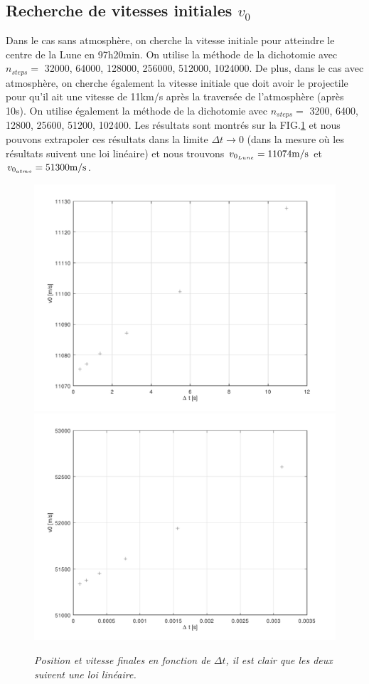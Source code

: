 \documentclass[a4paper,12pt,twoside]{article}
\begin{document}
\subsection{Recherche de vitesses initiales $v_0$}
Dans le cas sans atmosphère, on cherche la vitesse initiale pour atteindre le centre de la Lune en 97h20min. On utilise la méthode de la dichotomie avec $n_{steps}=$ 32000, 64000, 128000, 256000, 512000, 1024000. De plus, dans le cas avec atmosphère, on cherche également la vitesse initiale que doit avoir le projectile pour qu'il ait une vitesse de 11km/s après la traversée de l'atmosphère (après 10s). On utilise également la méthode de la dichotomie avec $n_{steps}=$ 3200, 6400, 12800, 25600, 51200, 102400. Les résultats sont montrés sur la FIG.\ref{convV0} et nous pouvons extrapoler ces résultats dans la limite $\Delta t \rightarrow 0$ (dans la mesure où les résultats suivent une loi linéaire) et nous trouvons $v_{0_{Lune}}=11074 \rm m/s$ et $v_{0_{atmo}}=51300 \rm m/s$.
\begin{figure} %
\begin{center}
\includegraphics[width=0.49 \textwidth]{../q1_3_c/convV0sans}
\includegraphics[width=0.49 \textwidth]{../q1_3_c/convV0avec}
\end{center}
\caption{\em \label{convV0} Position et vitesse finales en fonction de $\Delta t$, il est clair que les deux suivent une loi linéaire.}
\end{figure} %


\end{document}

